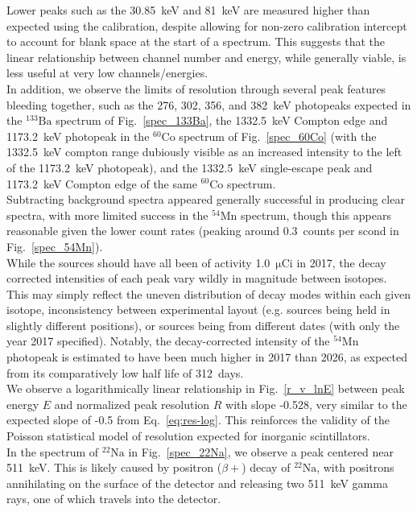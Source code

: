 \documentclass[12pt]{article}
\newcommand{\figref}[1]{Fig.~\ref{#1}}
\newcommand{\micCi}{\xspace$\mathrm{\mu Ci}$\xspace}
\newcommand{\NaSrc}{\xspace$\mathrm{^{22}Na}$\xspace}
\newcommand{\MnSrc}{\xspace$\mathrm{^{54}Mn}$\xspace}
\newcommand{\CoSrc}{\xspace$\mathrm{^{60}Co}$\xspace}
\newcommand{\BaSrc}{\xspace$\mathrm{^{133}Ba}$\xspace}
\begin{document}
Lower peaks such as the 30.85~keV and 81~keV are measured higher than expected using the calibration, despite allowing for non-zero calibration intercept to account for blank space at the start of a spectrum.
This suggests that the linear relationship between channel number and energy, while generally viable, is less useful at very low channels/energies.\\

In addition, we observe the limits of resolution through several peak features bleeding together, such as the 276, 302, 356, and 382~keV photopeaks expected in the \BaSrc spectrum of \figref{spec_133Ba}, the 1332.5~keV Compton edge and 1173.2~keV photopeak in the \CoSrc spectrum of \figref{spec_60Co} (with the 1332.5~keV compton range dubiously visible as an increased intensity to the left of the 1173.2~keV photopeak), and the 1332.5~keV single-escape peak and 1173.2~keV Compton edge of the same \CoSrc spectrum.\\

Subtracting background spectra appeared generally successful in producing clear spectra, with more limited success in the \MnSrc spectrum, though this appears reasonable given the lower count rates (peaking around 0.3~counts per scond in \figref{spec_54Mn}).\\

While the sources should have all been of activity 1.0~\micCi in 2017, the decay corrected intensities of each peak vary wildly in magnitude between isotopes.
This may simply reflect the uneven distribution of decay modes within each given isotope, inconsistency between experimental layout (e.g. sources being held in slightly different positions), or sources being from different dates (with only the year 2017 specified).
Notably, the decay-corrected intensity of the \MnSrc photopeak is estimated to have been much higher in 2017 than 2026, as expected from its comparatively low half life of 312~days.\\

We observe a logarithmically linear relationship in \figref{r_v_lnE} between peak energy $E$ and normalized peak resolution $R$ with slope -0.528, very similar to the expected slope of -0.5 from Eq.~\ref{eq:res-log}.
This reinforces the validity of the Poisson statistical model of resolution expected for inorganic scintillators.\\

In the spectrum of \NaSrc in \figref{spec_22Na}, we observe a peak centered near 511~keV.
This is likely caused by positron ($\beta+$) decay of \NaSrc, with positrons annihilating on the surface of the detector and releasing two 511~keV gamma rays, one of which travels into the detector\cite{noauthor_sodium_nodate}.\\
\end{document}
